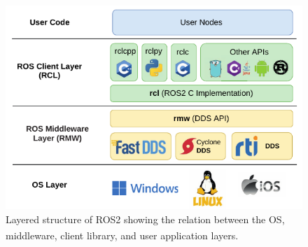 \begin{figure}[H]
    \centering
    \includegraphics[width=0.9\linewidth]{Pictures/Hardware/ROS2/Layers.png}
    \caption{Layered structure of ROS2 showing the relation between the OS, middleware, client library, and user application layers.\textsuperscript{\cite{ros2_layers}}}
    \label{fig:ros2-overview}
\end{figure}

\newpage

